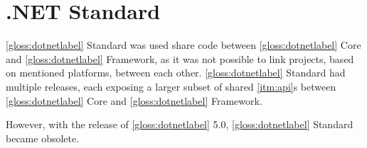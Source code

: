 \section{.NET Standard}
\ref{gloss:dotnetlabel} Standard was used share code between \ref{gloss:dotnetlabel} Core and \ref{gloss:dotnetlabel} Framework, as it was not possible to link projects, based on mentioned platforms, between each other. \ref{gloss:dotnetlabel} Standard had multiple releases, each exposing a larger subset of shared \ref{itm:api}s between \ref{gloss:dotnetlabel} Core and \ref{gloss:dotnetlabel} Framework.

However, with the release of \ref{gloss:dotnetlabel} 5.0, \ref{gloss:dotnetlabel} Standard became obsolete.